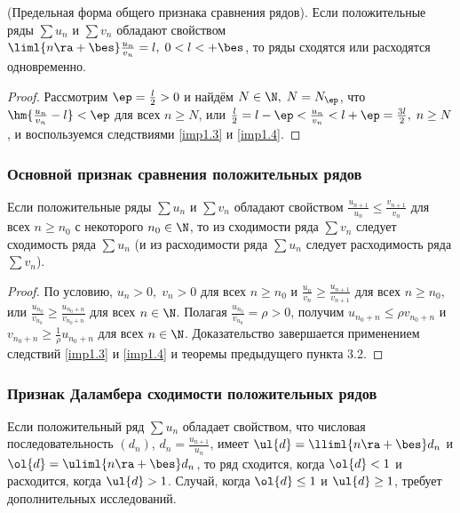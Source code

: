 \documentclass[a4paper]{article}
\begin{document}
\begin{imp}
(Предельная форма общего признака сравнения рядов). Если
положительные ряды $\sum u_n$ и $\sum v_n$ обладают свойством
$\liml{n\ra+\bes} \frac{u_n}{v_n}=l, \; 0<l<+\bes$, то ряды сходятся
или расходятся одновременно.
\end{imp}

\begin{proof}
Рассмотрим $\ep=\frac{l}2>0$ и найдём $N\in\N, \; N=N_{\ep}$, что
$\hm{\frac{u_n}{v_n} - l}<\ep$ для всех $n\ge N$, или $\frac{l}2 = l
- \ep < \frac{u_n}{v_n} < l+\ep = \frac{3l}2, \; n\ge N$, и
воспользуемся следствиями \ref{imp1.3} и \ref{imp1.4}.
\end{proof}

\subsubsection{Основной признак сравнения положительных рядов}
\begin{theorem}
Если положительные ряды $\sum u_n$ и $\sum v_n$ обладают свойством
$\frac{u_{n+1}}{u_n} \le \frac{v_{n+1}}{v_n}$ для всех $n\ge n_0$ с
некоторого $n_0\in\N$, то из сходимости ряда $\sum v_n$ следует
сходимость ряда $\sum u_n$ (и из расходимости ряда $\sum u_n$
следует расходимость ряда $\sum v_n$).
\end{theorem}

\begin{proof}
По условию, $u_n > 0, \; v_n>0$ для всех $n\ge n_0$ и
$\frac{u_n}{v_n} \ge \frac{u_{n+1}}{v_{n+1}}$ для всех $n\ge n_0$,
или $\frac{u_{n_0}}{v_{n_0}} \ge \frac{u_{n_0+n}}{v_{n_0+n}}$ для
всех $n\in\N$. Полагая $\frac{u_{n_0}}{v_{n_0}} = \rho > 0$, получим
$u_{n_0+n} \le \rho v_{n_0+n}$ и $v_{n_0+n} \ge \frac1{\rho}
u_{n_0+n}$ для всех $n\in\N$. Доказательство завершается применением
следствий \ref{imp1.3} и \ref{imp1.4} и теоремы предыдущего пункта
3.2.
\end{proof}

\subsubsection{Признак Даламбера сходимости положительных рядов}

\begin{theorem}
Если положительный ряд $\sum u_n$ обладает свойством, что числовая
последовательность $(d_n)$, $d_n = \frac{u_{n+1}}{u_n}$, имеет
$\ul{d}=\lliml{n\ra+\bes}d_n$ и $\ol{d} = \uliml{n\ra+\bes}d_n$, то
ряд сходится, когда $\ol{d}<1$ и расходится, когда $\ul{d}>1$.
Случай, когда $\ol{d} \le 1$ и $\ul{d}\ge1$, требует дополнительных
исследований.
\end{theorem}
\end{document}
